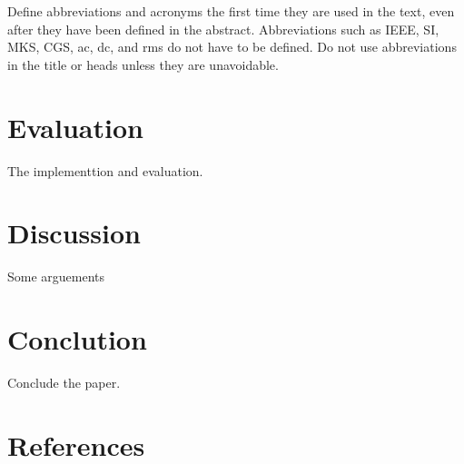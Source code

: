 \documentclass[conference]{IEEEtran}
\begin{document}
Define abbreviations and acronyms the first time they are used in the text, 
even after they have been defined in the abstract. Abbreviations such as 
IEEE, SI, MKS, CGS, ac, dc, and rms do not have to be defined. Do not use 
abbreviations in the title or heads unless they are unavoidable.

\section{Evaluation}

The implementtion and evaluation.

\section{Discussion}

Some arguements

\section{Conclution}

Conclude the paper.

\section*{References}




\end{document}
